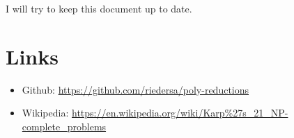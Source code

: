 \documentclass[11pt,a4paper]{scrartcl}
\begin{document}
	I will try to keep this document up to date. 

	\section{Links}
	\begin{itemize}
		\item Github: \url{https://github.com/riedersa/poly-reductions}
		\item Wikipedia: \url{https://en.wikipedia.org/wiki/Karp\%27s_21_NP-complete_problems} 
	\end{itemize}
	
	
	
\end{document}
